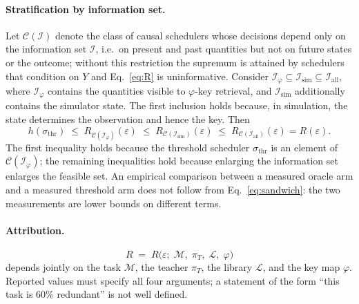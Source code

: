 \documentclass{article}
\begin{document}
\paragraph{Stratification by information set.}
Let $\mathcal{C}(\mathcal{I})$ denote the class of causal schedulers whose
decisions depend only on the information set $\mathcal{I}$, i.e.\ on present
and past quantities but not on future states or the outcome; without this
restriction the supremum is attained by schedulers that condition on $Y$ and
Eq.~\ref{eq:R} is uninformative. Consider
$\mathcal{I}_\varphi \subseteq \mathcal{I}_{\mathrm{sim}} \subseteq
\mathcal{I}_{\mathrm{all}}$, where $\mathcal{I}_\varphi$ contains the
quantities visible to $\varphi$-key retrieval, and
$\mathcal{I}_{\mathrm{sim}}$ additionally contains the simulator state. The
first inclusion holds because, in simulation, the state determines the
observation and hence the key. Then
\begin{equation}
h(\sigma_{\mathrm{thr}}) \;\le\; R_{\mathcal{C}(\mathcal{I}_\varphi)}(\varepsilon)
\;\le\; R_{\mathcal{C}(\mathcal{I}_{\mathrm{sim}})}(\varepsilon)
\;\le\; R_{\mathcal{C}(\mathcal{I}_{\mathrm{all}})}(\varepsilon) = R(\varepsilon).
\label{eq:sandwich}
\end{equation}
The first inequality holds because the threshold scheduler
$\sigma_{\mathrm{thr}}$ is an element of $\mathcal{C}(\mathcal{I}_\varphi)$;
the remaining inequalities hold because enlarging the information set enlarges
the feasible set. An empirical comparison between a measured oracle arm and a
measured threshold arm does not follow from Eq.~\ref{eq:sandwich}: the two
measurements are lower bounds on different terms.

\paragraph{Attribution.}
\begin{equation}
R \;=\; R\bigl(\varepsilon;\; \mathcal{M},\; \pi_T,\; \mathcal{L},\; \varphi\bigr)
\label{eq:quad}
\end{equation}
depends jointly on the task $\mathcal{M}$, the teacher $\pi_T$, the library
$\mathcal{L}$, and the key map $\varphi$. Reported values must specify all four
arguments; a statement of the form ``this task is $60\%$ redundant'' is not
well defined.
\end{document}
